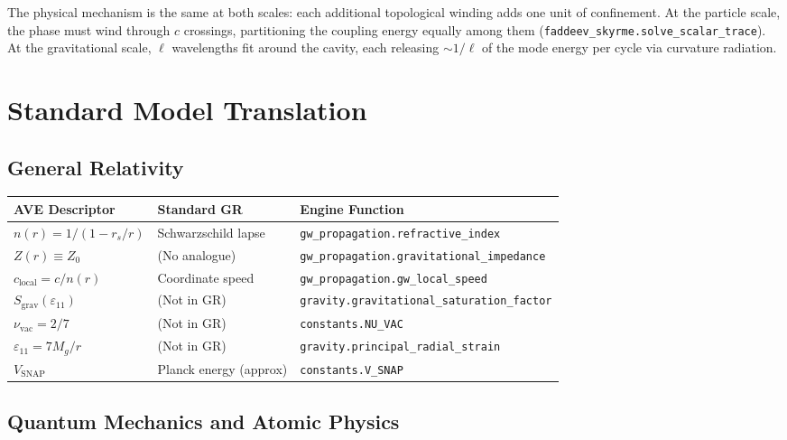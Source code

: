 \noindent The physical mechanism is the same at both scales: each additional topological winding adds one unit of confinement. At the particle scale, the phase must wind through $c$ crossings, partitioning the coupling energy equally among them (\texttt{faddeev\_skyrme.solve\_scalar\_trace}). At the gravitational scale, $\ell$ wavelengths fit around the cavity, each releasing $\sim 1/\ell$ of the mode energy per cycle via curvature radiation.


\section{Standard Model Translation}
\label{sec:sm_translation}

\subsection{General Relativity}

\begin{center}
\renewcommand{\arraystretch}{1.3}
\begin{tabularx}{\textwidth}{@{}l l X@{}}
\toprule
\textbf{AVE Descriptor} & \textbf{Standard GR} & \textbf{Engine Function} \\
\midrule
$n(r) = 1/(1 - r_s/r)$ & Schwarzschild lapse & \texttt{gw\_propagation.refractive\_index} \\
$Z(r) \equiv Z_0$ & (No analogue) & \texttt{gw\_propagation.gravitational\_impedance} \\
$c_\mathrm{local} = c/n(r)$ & Coordinate speed & \texttt{gw\_propagation.gw\_local\_speed} \\
$S_\mathrm{grav}(\varepsilon_{11})$ & (Not in GR) & \texttt{gravity.gravitational\_saturation\_factor} \\
$\nu_\mathrm{vac} = 2/7$ & (Not in GR) & \texttt{constants.NU\_VAC} \\
$\varepsilon_{11} = 7M_g/r$ & (Not in GR) & \texttt{gravity.principal\_radial\_strain} \\
$V_\mathrm{SNAP}$ & Planck energy (approx) & \texttt{constants.V\_SNAP} \\
\bottomrule
\end{tabularx}
\end{center}

\subsection{Quantum Mechanics and Atomic Physics}


